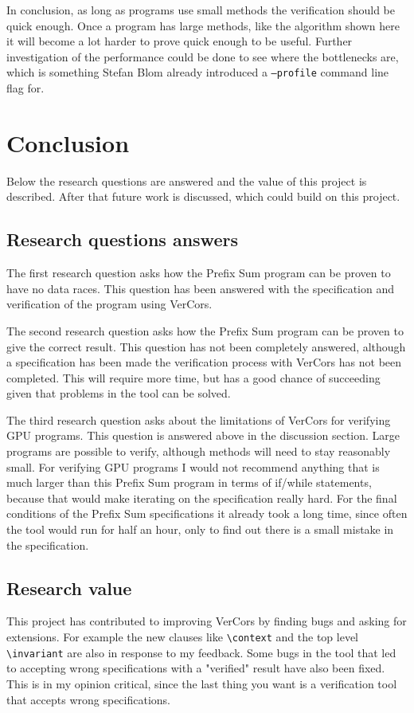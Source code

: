 \documentclass[a4paper]{article}
\newcommand{\code}[1]{\texttt{\small \color{inline}#1}} %
\begin{document}
In conclusion, as long as programs use small methods the verification should be quick enough. Once a program has large methods, like the algorithm shown here it will become a lot harder to prove quick enough to be useful. Further investigation of the performance could be done to see where the bottlenecks are, which is something Stefan Blom already introduced a \code{--profile} command line flag for.

\section{Conclusion}
Below the research questions are answered and the value of this project is described. After that future work is discussed, which could build on this project.

\subsection{Research questions answers}
The first research question asks how the Prefix Sum program can be proven to have no data races. This question has been answered with the specification and verification of the program using VerCors.

The second research question asks how the Prefix Sum program can be proven to give the correct result. This question has not been completely answered, although a specification has been made the verification process with VerCors has not been completed. This will require more time, but has a good chance of succeeding given that problems in the tool can be solved.

The third research question asks about the limitations of VerCors for verifying GPU programs. This question is answered above in the discussion section. Large programs are possible to verify, although methods will need to stay reasonably small. For verifying GPU programs I would not recommend anything that is much larger than this Prefix Sum program in terms of if/while statements, because that would make iterating on the specification really hard. For the final conditions of the Prefix Sum specifications it already took a long time, since often the tool would run for half an hour, only to find out there is a small mistake in the specification.

\subsection{Research value}
This project has contributed to improving VerCors by finding bugs and asking for extensions. For example the new clauses like \code{\textbackslash context} and the top level \code{\textbackslash invariant} are also in response to my feedback. Some bugs in the tool that led to accepting wrong specifications with a "verified" result have also been fixed. This is in my opinion critical, since the last thing you want is a verification tool that accepts wrong specifications.
\end{document}
